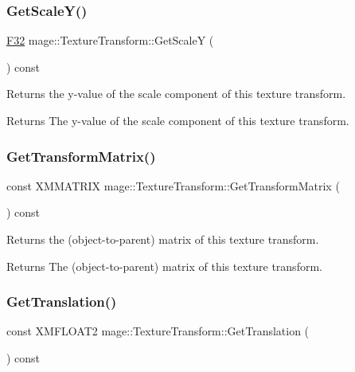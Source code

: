 \subsubsection{\texorpdfstring{Get\+Scale\+Y()}{GetScaleY()}}
{\footnotesize\ttfamily \hyperlink{namespacemage_aa97e833b45f06d60a0a9c4fc22ae02c0}{F32} mage\+::\+Texture\+Transform\+::\+Get\+ScaleY (\begin{DoxyParamCaption}{ }\end{DoxyParamCaption}) const\hspace{0.3cm}{\ttfamily [noexcept]}}

Returns the y-\/value of the scale component of this texture transform.

\begin{DoxyReturn}{Returns}
The y-\/value of the scale component of this texture transform. 
\end{DoxyReturn}
\hypertarget{classmage_1_1_texture_transform_adac9b7f5138ba53538b860cc83ad7e98}{}\label{classmage_1_1_texture_transform_adac9b7f5138ba53538b860cc83ad7e98} 
\subsubsection{\texorpdfstring{Get\+Transform\+Matrix()}{GetTransformMatrix()}}
{\footnotesize\ttfamily const X\+M\+M\+A\+T\+R\+IX mage\+::\+Texture\+Transform\+::\+Get\+Transform\+Matrix (\begin{DoxyParamCaption}{ }\end{DoxyParamCaption}) const\hspace{0.3cm}{\ttfamily [noexcept]}}

Returns the (object-\/to-\/parent) matrix of this texture transform.

\begin{DoxyReturn}{Returns}
The (object-\/to-\/parent) matrix of this texture transform. 
\end{DoxyReturn}
\hypertarget{classmage_1_1_texture_transform_afbb9d000cc5062982d5c20af4c885acb}{}\label{classmage_1_1_texture_transform_afbb9d000cc5062982d5c20af4c885acb} 
\subsubsection{\texorpdfstring{Get\+Translation()}{GetTranslation()}}
{\footnotesize\ttfamily const X\+M\+F\+L\+O\+A\+T2 mage\+::\+Texture\+Transform\+::\+Get\+Translation (\begin{DoxyParamCaption}{ }\end{DoxyParamCaption}) const\hspace{0.3cm}{\ttfamily [noexcept]}}

